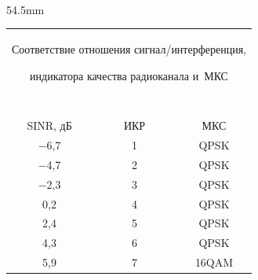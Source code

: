 \pagebreak





\





\vspace*{-12pt}







  \begin{floatingfigure}{54.5mm}


    {\small 


  \begin{center}


  \vspace*{-10pt}


  


  \tabcolsep=5pt


  \begin{tabular}{|c|c|c|}


  \multicolumn{3}{p{50mm}}{Соответствие отношения сиг\-нал\!/\!ин\-тер\-фе\-рен\-ция, 


индикатора качества радиоканала и~МКС}\\


  \multicolumn{3}{c}{\ }\\[-6pt]


  \hline


  SINR, дБ & \ \ ИКР\ \  & МКС\\


  \hline


  $-$6,7\hphantom{$-$} & \hphantom{9}1 & QPSK\\


  $-$4,7\hphantom{$-$} & \hphantom{9}2 &QPSK\\ 


  $-$2,3\hphantom{$-$} & \hphantom{9}3 & QPSK\\


  0,2    & \hphantom{9}4 & QPSK\\


  2,4    & \hphantom{9}5& QPSK\\


  4,3    & \hphantom{9}6& QPSK\\


  5,9    & \hphantom{9}7& 16QAM\\



\end{tabular}
\end{center}}
\end{floatingfigure}
